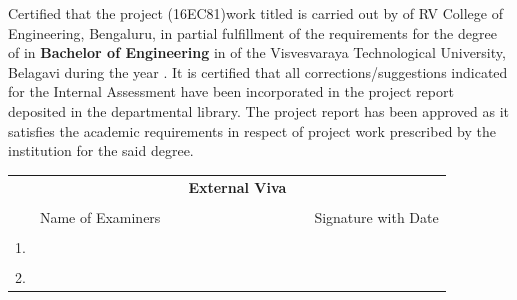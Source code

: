\begin{spacing}{1.5}
\noindent Certified that the \fi project (16EC81)work titled \textbf{\textit{\printTitle}} is carried out by
\fi
of RV College of Engineering, Bengaluru, in partial fulfillment of the requirements for the degree of  \ifPG \textbf{\printMastersInLF} in \textbf{\printMastersPrgName} \else\textbf{Bachelor of Engineering} in \textbf{\printDepartmentLF} \fi of the Visvesvaraya Technological University, Belagavi during the year \printAcadYear. It is certified that all corrections/suggestions indicated for the Internal Assessment have been incorporated in the \fi project report deposited in the departmental library. The \fi project report has been approved as it satisfies the academic requirements in respect of \fi project work prescribed by the institution for the said degree.\\ \par
\end{spacing}

\begin{table}[H]
\centering
{}
\end{table}

\begin{table}[H]
\centering
\begin{tabular}{lccp{6cm}cc}
&&&\textbf{External Viva}&&\\
&&&&&\\
&Name of Examiners &&& & Signature with Date\\
&&&&&\\
1.&&&&&\\
&&&&&\\
2.&&&&&\\
\end{tabular}%
\end{table}
